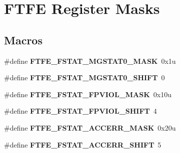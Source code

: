 \hypertarget{group__FTFE__Register__Masks}{}\section{F\+T\+FE Register Masks}
\label{group__FTFE__Register__Masks}
\subsection*{Macros}
\begin{DoxyCompactItemize}
\item 
\#define {\bfseries F\+T\+F\+E\+\_\+\+F\+S\+T\+A\+T\+\_\+\+M\+G\+S\+T\+A\+T0\+\_\+\+M\+A\+SK}~0x1u\hypertarget{group__FTFE__Register__Masks_ga8144f9200ceb6565f82fb1a1fa7cc81f}{}\label{group__FTFE__Register__Masks_ga8144f9200ceb6565f82fb1a1fa7cc81f}

\item 
\#define {\bfseries F\+T\+F\+E\+\_\+\+F\+S\+T\+A\+T\+\_\+\+M\+G\+S\+T\+A\+T0\+\_\+\+S\+H\+I\+FT}~0\hypertarget{group__FTFE__Register__Masks_ga0b957ce5ef0e701ed13ad42b933d07c3}{}\label{group__FTFE__Register__Masks_ga0b957ce5ef0e701ed13ad42b933d07c3}

\item 
\#define {\bfseries F\+T\+F\+E\+\_\+\+F\+S\+T\+A\+T\+\_\+\+F\+P\+V\+I\+O\+L\+\_\+\+M\+A\+SK}~0x10u\hypertarget{group__FTFE__Register__Masks_ga5e42a62c072299c6b9e89000a88d14a6}{}\label{group__FTFE__Register__Masks_ga5e42a62c072299c6b9e89000a88d14a6}

\item 
\#define {\bfseries F\+T\+F\+E\+\_\+\+F\+S\+T\+A\+T\+\_\+\+F\+P\+V\+I\+O\+L\+\_\+\+S\+H\+I\+FT}~4\hypertarget{group__FTFE__Register__Masks_gad92dedd179d9ea0737c82d0e98e5d4ff}{}\label{group__FTFE__Register__Masks_gad92dedd179d9ea0737c82d0e98e5d4ff}

\item 
\#define {\bfseries F\+T\+F\+E\+\_\+\+F\+S\+T\+A\+T\+\_\+\+A\+C\+C\+E\+R\+R\+\_\+\+M\+A\+SK}~0x20u\hypertarget{group__FTFE__Register__Masks_gac4af2fee557a255ba6f2d9aa5d32aaaa}{}\label{group__FTFE__Register__Masks_gac4af2fee557a255ba6f2d9aa5d32aaaa}

\item 
\#define {\bfseries F\+T\+F\+E\+\_\+\+F\+S\+T\+A\+T\+\_\+\+A\+C\+C\+E\+R\+R\+\_\+\+S\+H\+I\+FT}~5\hypertarget{group__FTFE__Register__Masks_ga6bb97df7d14c6a986778b1d8acb765b8}{}\label{group__FTFE__Register__Masks_ga6bb97df7d14c6a986778b1d8acb765b8}


\end{DoxyCompactItemize}
